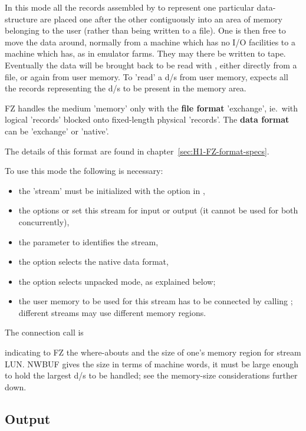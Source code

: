 In this mode all the records assembled by  to represent
one particular data-structure are placed one after the other
contiguously into an area of memory belonging to the user
(rather than being written to a file).
One is then free to move the data around,
normally from a machine which has no I/O facilities
to a machine which has, as in emulator farms.
They may there be written to tape.
Eventually the data will be brought back to be read with ,
either directly from a file, or again from user memory.
To 'read' a d/s from user memory,
 expects all the records representing the d/s
to be present in the memory area.

FZ handles the medium 'memory' only with the
\textbf{file format} 'exchange',
ie.~with logical 'records' blocked onto fixed-length physical
'records'.
The \textbf{data format} can be 'exchange' or 'native'.

The details of this format are found in chapter~\ref{sec:H1-FZ-format-specs}.

To use this mode the following is necessary:
\begin{itemize}
\item the 'stream' must be initialized with the  
      option in ,
\item the options  or  
      set this stream for input or output
      (it cannot be used for both concurrently),
\item the parameter  to  identifies the stream,
\item the  option selects the native data format,
\item the  option selects unpacked mode, as explained below;
\item the user memory to be used for this stream
      has to be connected by calling ;
      different streams may use different memory regions.
\end{itemize}

The connection call is


indicating to FZ the where-abouts and the size of one's
memory region for stream LUN.
NWBUF gives the size in terms of machine words,
it must be large enough to hold the largest d/s to be handled;
see the memory-size considerations further down.

\subsection*{Output}

